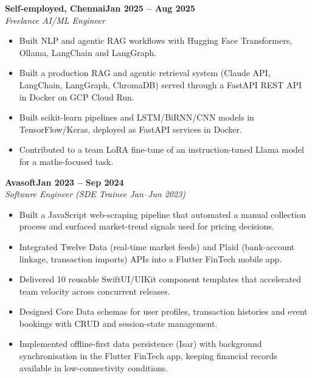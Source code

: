 \documentclass[a4paper,11pt]{article}
\newcommand{\entry}[4]{\needspace{4\baselineskip}\noindent\textbf{#1}\hfill\textbf{#2}\\ \textit{#3}\hfill\textit{#4}\par}
\begin{document}
\vspace{4pt}
\entry{Self-employed, Chennai}{Jan 2025 – Aug 2025}{Freelance AI/ML Engineer}{}
\begin{itemize}
  \item Built NLP and agentic RAG workflows with Hugging Face Transformers, Ollama, LangChain and LangGraph.
  \item Built a production RAG and agentic retrieval system (Claude API, LangChain, LangGraph, ChromaDB) served through a FastAPI REST API in Docker on GCP Cloud Run.
  \item Built scikit-learn pipelines and LSTM/BiRNN/CNN models in TensorFlow/Keras, deployed as FastAPI services in Docker.
  \item Contributed to a team LoRA fine-tune of an instruction-tuned Llama model for a maths-focused task.
\end{itemize}
\vspace{4pt}
\entry{Avasoft}{Jan 2023 – Sep 2024}{Software Engineer (SDE Trainee Jan–Jun 2023)}{}
\begin{itemize}
  \item Built a JavaScript web-scraping pipeline that automated a manual collection process and surfaced market-trend signals used for pricing decisions.
  \item Integrated Twelve Data (real-time market feeds) and Plaid (bank-account linkage, transaction imports) APIs into a Flutter FinTech mobile app.
  \item Delivered 10 reusable SwiftUI/UIKit component templates that accelerated team velocity across concurrent releases.
  \item Designed Core Data schemas for user profiles, transaction histories and event bookings with CRUD and session-state management.
  \item Implemented offline-first data persistence (Isar) with background synchronisation in the Flutter FinTech app, keeping financial records available in low-connectivity conditions.
\end{itemize}

\end{document}
